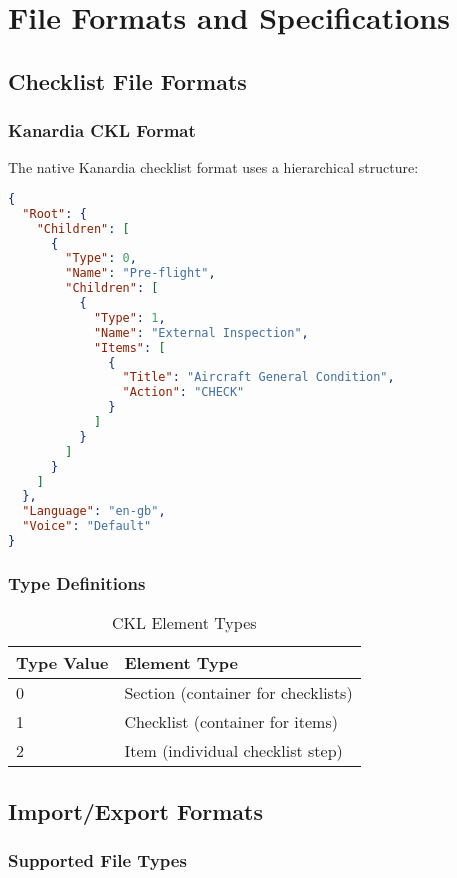 \chapter{File Formats and Specifications}

\section{Checklist File Formats}

\subsection{Kanardia CKL Format}

The native Kanardia checklist format uses a hierarchical structure:

\begin{lstlisting}[language=json]
{
  "Root": {
    "Children": [
      {
        "Type": 0,
        "Name": "Pre-flight",
        "Children": [
          {
            "Type": 1,
            "Name": "External Inspection",
            "Items": [
              {
                "Title": "Aircraft General Condition",
                "Action": "CHECK"
              }
            ]
          }
        ]
      }
    ]
  },
  "Language": "en-gb",
  "Voice": "Default"
}
\end{lstlisting}

\subsection{Type Definitions}

\begin{table}[H]
\centering
\begin{tabular}{@{}ll@{}}
\toprule
\textbf{Type Value} & \textbf{Element Type} \\
\midrule
0 & Section (container for checklists) \\
1 & Checklist (container for items) \\
2 & Item (individual checklist step) \\
\bottomrule
\end{tabular}
\caption{CKL Element Types}
\label{tab:ckl_types}
\end{table}

\section{Import/Export Formats}

\subsection{Supported File Types}

